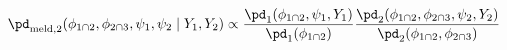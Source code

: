 \begin{equation}
  \pd_{\text{meld}, 2} (\phi_{1 \cap 2}, \phi_{2 \cap 3}, \psi_{1}, \psi_{2} \mid Y_{1}, Y_{2}) \propto
  \frac {
    \pd_{1}(\phi_{1 \cap 2}, \psi_{1}, Y_{1})
  } {
    \pd_{1}(\phi_{1 \cap 2})
  }
  \frac {
    \pd_{2} (\phi_{1 \cap 2}, \phi_{2 \cap 3}, \psi_{2}, Y_{2})
  } {
    \pd_{2}(\phi_{1 \cap 2}, \phi_{2 \cap 3})
  }
  \label{eqn:stage-two-target}
\end{equation}